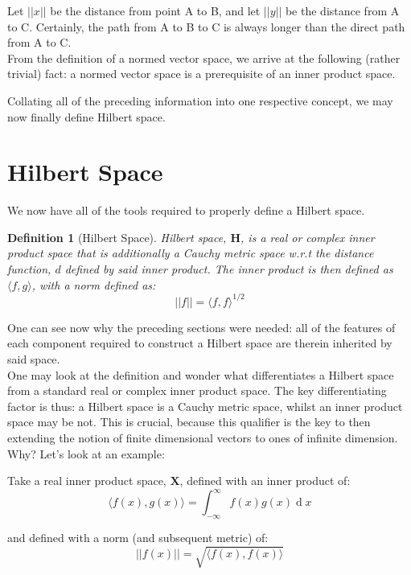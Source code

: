 \documentclass[12pt,a4paper]{report}
\DeclareMathOperator{\deriv}{d}
\theoremstyle{thms}
\theoremstyle{defns}
\newtheorem{definition}{Definition}[section]
\begin{document}
Let $||x||$ be the distance from point A to B, and let $||y||$ be the distance from A to C. Certainly, the path from A to B to C is always longer than the direct path from A to C.\\
From the definition of a normed vector space, we arrive at the following (rather trivial) fact: a normed vector space is a prerequisite of an inner product space.

Collating all of the preceding information into one respective concept, we may now finally define Hilbert space.

\section{Hilbert Space}
We now have all of the tools required to properly define a Hilbert space.

\begin{definition}[Hilbert Space]
    Hilbert space, $\mathbf{H}$, is a real or complex inner product space that is additionally a Cauchy metric space w.r.t the distance function, $d$ defined by said inner product. The inner product is then defined as $\langle f, g \rangle$, with a norm defined as:
    \begin{equation}
        ||f|| = {\langle f, f \rangle}^{1/2}
    \end{equation}
\end{definition}

One can see now why the preceding sections were needed: all of the features of each component required to construct a Hilbert space are therein inherited by said space.\\
One may look at the definition and wonder what differentiates a Hilbert space from a standard real or complex inner product space. The key differentiating factor is thus: a Hilbert space is a Cauchy metric space, whilst an inner product space may be not. This is crucial, because this qualifier is the key to then extending the notion of finite dimensional vectors to ones of infinite dimension. Why? Let's look at an example:

Take a real inner product space, $\mathbf{X}$, defined with an inner product of:
\begin{equation}
    \langle f(x), g(x) \rangle = \int_{-\infty}^{\infty}f(x)g(x) \deriv{x}
\end{equation}

and defined with a norm (and subsequent metric) of:
\begin{equation}
    ||f(x)|| = 	\sqrt{\langle f(x), f(x) \rangle}
\end{equation}
\end{document}
